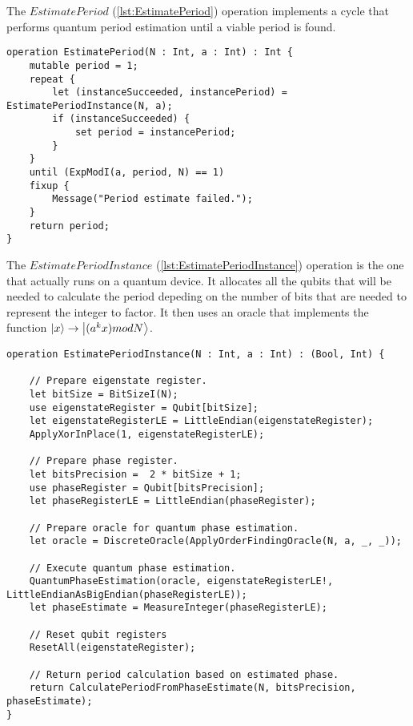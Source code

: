 The $EstimatePeriod$ (\ref{lst:EstimatePeriod}) operation implements a cycle that performs quantum period estimation until a viable period is found.

\begin{lstlisting}[language=qsharp,label=lst:EstimatePeriod,caption={Q\# implementation of the EstimatePeriod operation}]
operation EstimatePeriod(N : Int, a : Int) : Int {
    mutable period = 1;
    repeat {
        let (instanceSucceeded, instancePeriod) = EstimatePeriodInstance(N, a);
        if (instanceSucceeded) {
            set period = instancePeriod;
        }
    }
    until (ExpModI(a, period, N) == 1)
    fixup {
        Message("Period estimate failed.");
    }
    return period;
}
\end{lstlisting}

The $EstimatePeriodInstance$ (\ref{lst:EstimatePeriodInstance}) operation is the one that actually runs on a quantum device. It allocates all the qubits that will be needed to calculate the period depeding on the number of bits that are needed to represent the integer to factor. It then uses an oracle that implements the function $\left|{x}\right\rangle \rightarrow \left|{(a^k x) mod N}\right\rangle$.

\begin{lstlisting}[language=qsharp,label=lst:EstimatePeriodInstance,caption={Q\# implementation of the EstimatePeriodInstance operation}]
operation EstimatePeriodInstance(N : Int, a : Int) : (Bool, Int) {

    // Prepare eigenstate register.
    let bitSize = BitSizeI(N);
    use eigenstateRegister = Qubit[bitSize];
    let eigenstateRegisterLE = LittleEndian(eigenstateRegister);
    ApplyXorInPlace(1, eigenstateRegisterLE);

    // Prepare phase register.
    let bitsPrecision =  2 * bitSize + 1;
    use phaseRegister = Qubit[bitsPrecision];
    let phaseRegisterLE = LittleEndian(phaseRegister);

    // Prepare oracle for quantum phase estimation.
    let oracle = DiscreteOracle(ApplyOrderFindingOracle(N, a, _, _));

    // Execute quantum phase estimation.
    QuantumPhaseEstimation(oracle, eigenstateRegisterLE!, LittleEndianAsBigEndian(phaseRegisterLE));
    let phaseEstimate = MeasureInteger(phaseRegisterLE);

    // Reset qubit registers 
    ResetAll(eigenstateRegister);

    // Return period calculation based on estimated phase.
    return CalculatePeriodFromPhaseEstimate(N, bitsPrecision, phaseEstimate);
}
\end{lstlisting}

